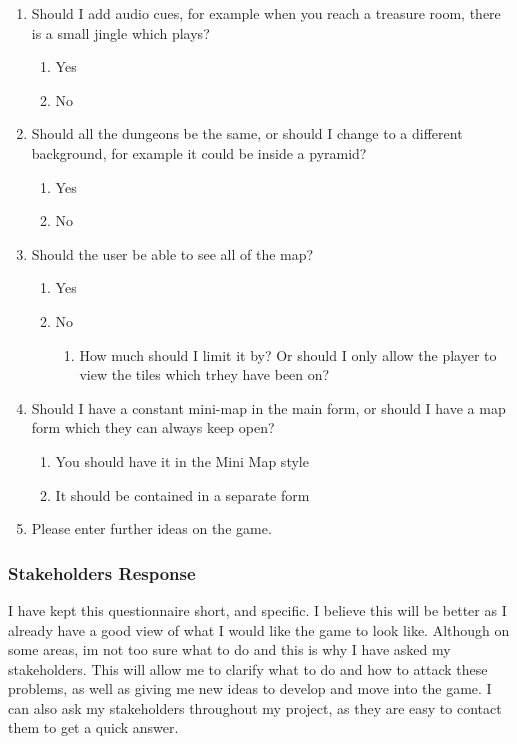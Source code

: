 \documentclass[12pt]{article}
\begin{document}
\begin{enumerate}
	\item{Should I add audio cues, for example when you reach a treasure room, there is a small jingle which plays?}
		\begin{enumerate}
		\item Yes
		\item No
		\end{enumerate}

	\item{Should all the dungeons be the same, or should I change to a different background, for example it could be inside a pyramid?}
		\begin{enumerate}
		\item Yes
		\item No
		\end{enumerate}

	\item{Should the user be able to see all of the map?}
		\begin{enumerate}
		\item Yes
		\item No
			\begin{enumerate}
				\item How much should I limit it by? Or should I only allow the player to view the tiles which trhey have been on?
			\end{enumerate}
		\end{enumerate}


	\item{Should I have a constant mini-map in the main form, or should I have a map form which they can always keep open?}
		\begin{enumerate}
		\item You should have it in the Mini Map style
		\item It should be contained in a separate form
		\end{enumerate}

	\item{Please enter further ideas on the game.}
\end{enumerate}



			\subsubsection{Stakeholders Response}


I have kept this questionnaire short, and specific. I believe this will be better as I already have a good view of what I would like the game to look like. Although on some areas, im not too sure what to do and this is why I have asked my stakeholders. This will allow me to clarify what to do and how to attack these problems, as well as giving me new ideas to develop and move into the game. I can also ask my stakeholders throughout my project, as they are easy to contact them to get a quick answer.
\end{document}
